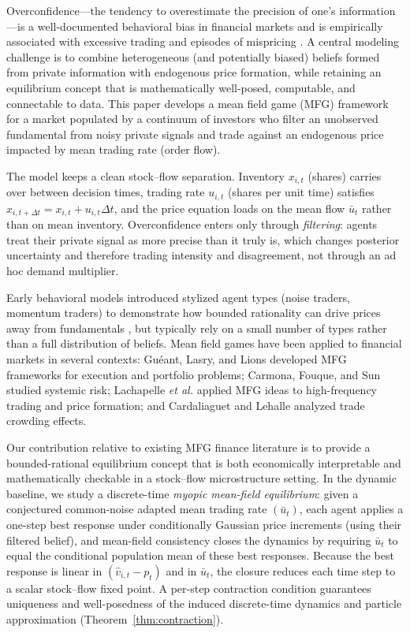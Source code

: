 
Overconfidence---the tendency to overestimate the precision of one's information---is a well-documented behavioral bias in financial markets and is empirically associated with excessive trading and episodes of mispricing \cite{Odean1998,BarberOdean2001}. A central modeling challenge is to combine heterogeneous (and potentially biased) beliefs formed from private information with endogenous price formation, while retaining an equilibrium concept that is mathematically well-posed, computable, and connectable to data. This paper develops a mean field game (MFG) framework for a market populated by a continuum of investors who filter an unobserved fundamental from noisy private signals and trade against an endogenous price impacted by mean trading rate (order flow).

The model keeps a clean stock--flow separation. Inventory $x_{i,t}$ (shares) carries over between decision times, trading rate $u_{i,t}$ (shares per unit time) satisfies $x_{i,t+\Delta t}=x_{i,t}+u_{i,t}\Delta t$, and the price equation loads on the mean flow $\bar u_t$ rather than on mean inventory. Overconfidence enters only through \emph{filtering}: agents treat their private signal as more precise than it truly is, which changes posterior uncertainty and therefore trading intensity and disagreement, not through an ad hoc demand multiplier.

Early behavioral models introduced stylized agent types (noise traders, momentum traders) to demonstrate how bounded rationality can drive prices away from fundamentals \cite{DeLong1990,Hong1999,DanielHirshleiferSubrahmanyam1998,GervaisOdean2001}, but typically rely on a small number of types rather than a full distribution of beliefs. Mean field games have been applied to financial markets in several contexts: Gu\'eant, Lasry, and Lions \cite{GueantLasryLions2010} developed MFG frameworks for execution and portfolio problems; Carmona, Fouque, and Sun \cite{CarmonaFouqueSun2015} studied systemic risk; Lachapelle \emph{et al.} \cite{LachapelleLasryLehalleLions2016} applied MFG ideas to high-frequency trading and price formation; and Cardaliaguet and Lehalle \cite{CardaliaguetLehalle2018} analyzed trade crowding effects.

Our contribution relative to existing MFG finance literature is to provide a bounded-rational equilibrium concept that is both economically interpretable and mathematically checkable in a stock--flow microstructure setting. In the dynamic baseline, we study a discrete-time \emph{myopic mean-field equilibrium}: given a conjectured common-noise adapted mean trading rate $(\bar u_t)$, each agent applies a one-step \CARA best response under conditionally Gaussian price increments (using their filtered belief), and mean-field consistency closes the dynamics by requiring $\bar u_t$ to equal the conditional population mean of these best responses. Because the best response is linear in $(\hat v_{i,t}-p_t)$ and in $\bar u_t$, the closure reduces each time step to a scalar stock--flow fixed point. A per-step contraction condition guarantees uniqueness and well-posedness of the induced discrete-time dynamics and particle approximation (Theorem~\ref{thm:contraction}).


